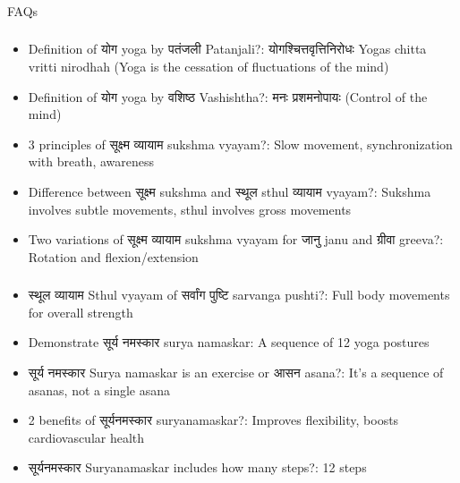 \begin{frame}[fragile]\frametitle{}
\begin{center}
{\Large FAQs}
\end{center}
\end{frame}

\begin{frame}[fragile]\frametitle{}
\begin{itemize}
\item Definition of योग yoga by पतंजली Patanjali?: योगश्चित्तवृत्तिनिरोधः Yogas chitta vritti nirodhah (Yoga is the cessation of fluctuations of the mind)
\item Definition of योग  yoga by वशिष्ठ  Vashishtha?: मनः प्रशमनोपायः  (Control of the mind)
\item 3 principles of सूक्ष्म व्यायाम sukshma vyayam?: Slow movement, synchronization with breath, awareness
\item Difference between सूक्ष्म sukshma and स्थूल sthul व्यायाम vyayam?: Sukshma involves subtle movements, sthul involves gross movements
\item Two variations of सूक्ष्म व्यायाम sukshma vyayam for जानु janu and ग्रीवा greeva?: Rotation and flexion/extension
\end{itemize}
\end{frame}

\begin{frame}[fragile]\frametitle{}
\begin{itemize}
\item स्थूल व्यायाम Sthul vyayam of सर्वांग पुष्टि sarvanga pushti?: Full body movements for overall strength
\item Demonstrate सूर्य नमस्कार surya namaskar: A sequence of 12 yoga postures
\item सूर्य नमस्कार Surya namaskar is an exercise or आसन asana?: It's a sequence of asanas, not a single asana
\item 2 benefits of सूर्यनमस्कार suryanamaskar?: Improves flexibility, boosts cardiovascular health
\item सूर्यनमस्कार Suryanamaskar includes how many steps?: 12 steps
\end{itemize}
\end{frame}

